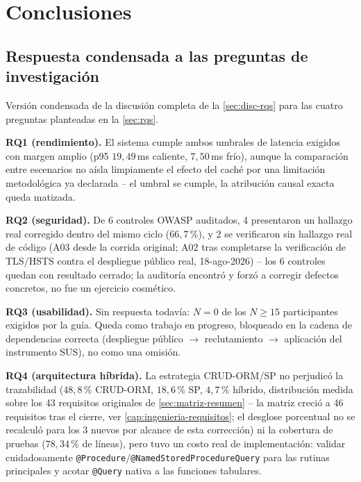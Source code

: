 \chapter{Conclusiones}

\section{Respuesta condensada a las preguntas de investigación}

Versión condensada de la discusión completa de la
\autoref{sec:disc-rqs} para las cuatro preguntas planteadas en la
\autoref{sec:rqs}.

\textbf{RQ1 (rendimiento).} El sistema cumple ambos umbrales de latencia
exigidos con margen amplio (p95 $19{,}49$\,ms caliente,
$7{,}50$\,ms frío), aunque la comparación entre escenarios no aísla
limpiamente el efecto del caché por una limitación metodológica ya
declarada -- el umbral se cumple, la atribución causal exacta queda
matizada.

\textbf{RQ2 (seguridad).} De 6 controles OWASP auditados, 4 presentaron
un hallazgo real corregido dentro del mismo ciclo ($66{,}7$\,\%), y 2 se
verificaron sin hallazgo real de código (A03 desde la corrida original;
A02 tras completarse la verificación de TLS/HSTS contra el despliegue
público real, 18-ago-2026) -- los 6 controles quedan con resultado
cerrado; la auditoría encontró y forzó a corregir defectos concretos, no
fue un ejercicio cosmético.

\textbf{RQ3 (usabilidad).} Sin respuesta todavía: $N=0$ de los
$N\geq15$ participantes exigidos por la guía. Queda como trabajo en
progreso, bloqueado en la cadena de dependencias correcta (despliegue
público $\to$ reclutamiento $\to$ aplicación del instrumento SUS), no
como una omisión.

\textbf{RQ4 (arquitectura híbrida).} La estrategia CRUD-ORM/SP no
perjudicó la trazabilidad ($48{,}8$\,\% CRUD-ORM, $18{,}6$\,\% SP,
$4{,}7$\,\% híbrido, distribución medida sobre los 43 requisitos
originales de \autoref{sec:matriz-resumen} -- la matriz creció a 46
requisitos tras el cierre, ver \autoref{cap:ingenieria-requisitos}; el
desglose porcentual no se recalculó para los 3 nuevos por alcance de
esta corrección) ni la cobertura de pruebas ($78{,}34$\,\% de líneas),
pero tuvo un costo real de implementación: validar cuidadosamente
\texttt{@Procedure}/\texttt{@NamedStoredProcedureQuery} para las rutinas
principales y acotar \texttt{@Query} nativa a las funciones tabulares.

